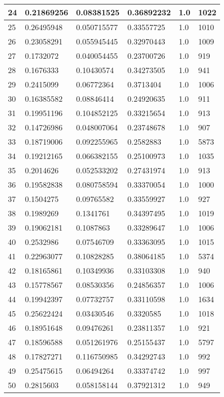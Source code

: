 \begin{longtable}{|l|l|l|l|l|l|}
24 & 0.21869256 & 0.08381525 & 0.36892232 & 1.0 & 1022 \\ \hline 
25 & 0.26495948 & 0.050715577 & 0.33557725 & 1.0 & 1010 \\ \hline 
26 & 0.23058291 & 0.055945445 & 0.32970443 & 1.0 & 1009 \\ \hline 
27 & 0.1732072 & 0.040054455 & 0.23700726 & 1.0 & 919 \\ \hline 
28 & 0.1676333 & 0.10430574 & 0.34273505 & 1.0 & 941 \\ \hline 
29 & 0.2415099 & 0.06772364 & 0.3713404 & 1.0 & 1006 \\ \hline 
30 & 0.16385582 & 0.08846414 & 0.24920635 & 1.0 & 911 \\ \hline 
31 & 0.19951196 & 0.104852125 & 0.33215654 & 1.0 & 913 \\ \hline 
32 & 0.14726986 & 0.048007064 & 0.23748678 & 1.0 & 907 \\ \hline 
33 & 0.18719006 & 0.092255965 & 0.2582883 & 1.0 & 5873 \\ \hline 
34 & 0.19212165 & 0.066382155 & 0.25100973 & 1.0 & 1035 \\ \hline 
35 & 0.2014626 & 0.052533202 & 0.27431974 & 1.0 & 913 \\ \hline 
36 & 0.19582838 & 0.080758594 & 0.33370054 & 1.0 & 1000 \\ \hline 
37 & 0.1504275 & 0.09765582 & 0.33559927 & 1.0 & 927 \\ \hline 
38 & 0.1989269 & 0.1341761 & 0.34397495 & 1.0 & 1019 \\ \hline 
39 & 0.19062181 & 0.1087863 & 0.33289647 & 1.0 & 1006 \\ \hline 
40 & 0.2532986 & 0.07546709 & 0.33363095 & 1.0 & 1015 \\ \hline 
41 & 0.22963077 & 0.10828285 & 0.38064185 & 1.0 & 5374 \\ \hline 
42 & 0.18165861 & 0.10349936 & 0.33103308 & 1.0 & 940 \\ \hline 
43 & 0.15778567 & 0.08530356 & 0.24856357 & 1.0 & 1006 \\ \hline 
44 & 0.19942397 & 0.07732757 & 0.33110598 & 1.0 & 1634 \\ \hline 
45 & 0.25622424 & 0.03430546 & 0.3320585 & 1.0 & 1018 \\ \hline 
46 & 0.18951648 & 0.09476261 & 0.23811357 & 1.0 & 921 \\ \hline 
47 & 0.18596588 & 0.051261976 & 0.25155437 & 1.0 & 5797 \\ \hline 
48 & 0.17827271 & 0.116750985 & 0.34292743 & 1.0 & 992 \\ \hline 
49 & 0.25475615 & 0.06494264 & 0.33374742 & 1.0 & 997 \\ \hline 
50 & 0.2815603 & 0.058158144 & 0.37921312 & 1.0 & 949 \\ \hline 
\end{longtable}